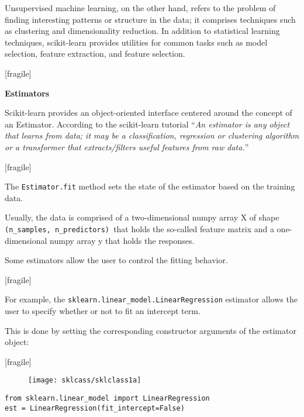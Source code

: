 \documentclass[MASTER.tex]{subfiles}
\begin{document}
   
 Unsupervised machine learning, on the other hand, refers to the problem of finding interesting patterns or structure in the data; it comprises techniques such as clustering and dimensionality reduction.
   In addition to statistical learning techniques, scikit-learn provides utilities for common tasks such as model selection, feature extraction, and feature selection.
 
 
 [fragile]
  
\noindent \textbf{Estimators}
 
\item Scikit-learn provides an object-oriented interface centered around the concept of an Estimator.  According to the scikit-learn tutorial “\textit{An estimator is any object that learns from data; it may be a classification, regression or clustering algorithm or a transformer that extracts/filters useful features from raw data.}”  
 
 


 [fragile]
  
 
\item The \texttt{Estimator.fit} method sets the state of the estimator based on the training data. 
\item Usually, the data is comprised of a two-dimensional numpy array X of shape \texttt{(n\_samples, n\_predictors) }that holds the so-called feature matrix and a one-dimensional numpy array y that holds the responses. 
\item Some estimators allow the user to control the fitting behavior. 
 
 


 [fragile]
  
  
   For example, the \texttt{sklearn.linear\_model.LinearRegression} estimator allows the user to specify whether or not to fit an intercept term. 
\item This is done by setting the corresponding constructor arguments of the estimator object:
 
 
 [fragile]
 \begin{figure}
\centering
\texttt{[image: sklcass/sklclass1a]}

\end{figure}

 
\begin{framed}
\begin{verbatim}
from sklearn.linear_model import LinearRegression
est = LinearRegression(fit_intercept=False)
\end{verbatim}
\end{framed}
\end{document}
